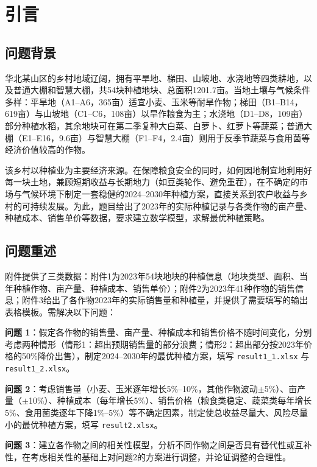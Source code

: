 \section{引言}
\subsection{问题背景}

华北某山区的乡村地域辽阔，拥有平旱地、梯田、山坡地、水浇地等四类耕地，以及普通大棚和智慧大棚，共54块种植地块、总面积1201.7亩。当地土壤与气候条件多样：平旱地（A1--A6，365亩）适宜小麦、玉米等耐旱作物；梯田（B1--B14，619亩）与山坡地（C1--C6，108亩）以旱作粮食为主；水浇地（D1--D8，109亩）部分种植水稻，其余地块可在第二季复种大白菜、白萝卜、红萝卜等蔬菜；普通大棚（E1--E16，9.6亩）与智慧大棚（F1--F4，2.4亩）则用于反季节蔬菜与食用菌等经济价值较高的作物。

该乡村以种植业为主要经济来源。在保障粮食安全的同时，如何因地制宜地利用好每一块土地，兼顾短期收益与长期地力（如豆类轮作、避免重茬），在不确定的市场与气候环境下制定一套稳健的2024--2030年种植方案，直接关系到农户收益与乡村的可持续发展。为此，题目给出了2023年的实际种植记录与各类作物的亩产量、种植成本、销售单价等数据，要求建立数学模型，求解最优种植策略。

\subsection{问题重述}

附件提供了三类数据：附件1为2023年54块地块的种植信息（地块类型、面积、当年种植作物、亩产量、种植成本、销售单价）；附件2为2023年41种作物的销售信息；附件3给出了各作物2023年的实际销售量和种植量，并提供了需要填写的输出表格模板。需解决以下问题：

\noindent\textbf{问题 1}：假定各作物的销售量、亩产量、种植成本和销售价格不随时间变化，分别考虑两种情形（情形1：超出预期销售量的部分浪费；情形2：超出部分按2023年价格的50\%降价出售），制定2024--2030年的最优种植方案，填写 \texttt{result1\_1.xlsx} 与 \texttt{result1\_2.xlsx}。

\noindent\textbf{问题 2}：考虑销售量（小麦、玉米逐年增长5\%--10\%，其他作物波动$\pm$5\%）、亩产量（$\pm$10\%）、种植成本（每年增长5\%）、销售价格（粮食类稳定、蔬菜类每年增长5\%、食用菌类逐年下降1\%--5\%）等不确定因素，制定使总收益尽量大、风险尽量小的最优种植方案，填写 \texttt{result2.xlsx}。

\noindent\textbf{问题 3}：建立各作物之间的相关性模型，分析不同作物之间是否具有替代性或互补性，在考虑相关性的基础上对问题2的方案进行调整，并论证调整的合理性。

